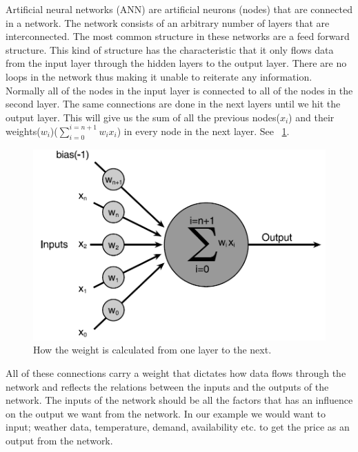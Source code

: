 Artificial neural networks (ANN) are artificial neurons (nodes) that are connected in a network. The network consists of an arbitrary number of layers that are interconnected. The most common structure in these networks are a feed forward structure. This kind of structure has the characteristic that it only flows data from the input layer through the hidden layers to the output layer. There are no loops in the network thus making it unable to reiterate any information. Normally all of the nodes in the input layer is connected to all of the nodes in the second layer. The same connections are done in the next layers until we hit the output layer. This will give us the sum of all the previous nodes($x_i$) and their weights($w_i$)($\sum_{i=0}^{i=n+1} w_i x_i$) in every node in the next layer. See ~\ref{fig:weight_of_layers}.
\begin{figure}[!ht]
\centering
\includegraphics[width=0.8\linewidth]{billeder/weight_of_layers.png}
\caption{How the weight is calculated from one layer to the next. \cite[P. 251]{buckland2002ai}}
\label{fig:weight_of_layers}
\end{figure}
All of these connections carry a weight that dictates how data flows through the network and reflects the relations between the inputs and the outputs of the network. The inputs of the network should be all the factors that has an influence on the output we want from the network. In our example we would want to input; weather data, temperature, demand, availability etc. \cite{21} to get the price as an output from the network.

